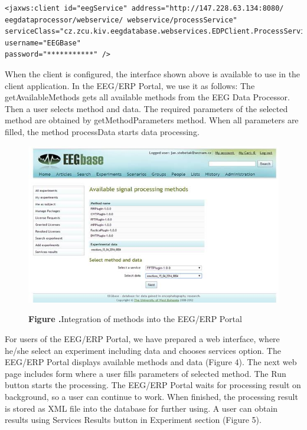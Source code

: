 \documentclass{frontiersSCNS} %
\begin{document}
\begin{small}
\begin{verbatim}
<jaxws:client id="eegService" address="http://147.228.63.134:8080/
eegdataprocessor/webservice/ webservice/processService"
serviceClass="cz.zcu.kiv.eegdatabase.webservices.EDPClient.ProcessService"
username="EEGBase"
password="***********" />
\end{verbatim}
\end{small}

When the client is configured, the interface shown above is available to use in the client application. In the EEG/ERP Portal, we use it as follows: The getAvailableMethods gets all available methods from the EEG Data Processor. Then a user selects method and data. The required parameters of the selected method are obtained by getMethodParameters method. When all parameters are filled, the method processData starts data processing.

\begin{figure}
\begin{center}
\includegraphics[width=16cm]{portal01}%
\end{center}
\textbf{\label{fig:04} Figure .}{Integration of methods into the EEG/ERP Portal }
\end{figure}

For users of the EEG/ERP Portal, we have prepared a web interface, where he/she select an experiment including data and chooses services option. The EEG/ERP Portal displays available methods and data (Figure 4). The next web page includes form where a user fills parameters of selected method. The Run button starts the processing. The EEG/ERP Portal waits for processing result on background, so a user can continue to work. When finished, the processing result is stored as XML file into the database for further using. A user can obtain results using Services Results button in Experiment section (Figure 5).
\end{document}
